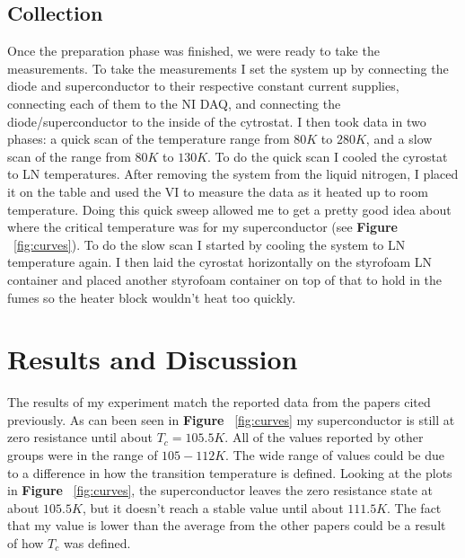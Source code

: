 \documentclass[paper=a4, fontsize=11pt]{scrartcl}
\numberwithin{equation}{section}
\numberwithin{figure}{section}
\numberwithin{table}{section}
\begin{document}
      \subsection{Collection}

            Once the preparation phase was finished, we were ready to take the measurements. To take the measurements I set the system up by connecting the diode and superconductor to their respective constant current supplies, connecting each of them to the NI DAQ, and connecting the diode/superconductor to the inside of the cytrostat. I then took data in two phases: a quick scan of the temperature range from $80K$ to $280K$, and a slow scan of the range from $80K$ to $130 K$. To do the quick scan I cooled the cyrostat to LN temperatures. After removing the system from the liquid nitrogen, I placed it on the table and used the VI to measure the data as it heated up to room temperature. Doing this quick sweep allowed me to get a pretty good idea about where the critical temperature was for my superconductor (see \textbf{Figure} ~\ref{fig:curves}). To do the slow scan I started by cooling the system to LN temperature again. I then laid the cyrostat horizontally on the styrofoam LN container and placed another styrofoam container on top of that to hold in the fumes so the heater block wouldn't heat too quickly.



  \section{Results and Discussion}

      The results of my experiment match the reported data from the papers cited previously. As can been seen in \textbf{Figure} ~\ref{fig:curves} my superconductor is still at zero resistance until about $T_c = 105.5K$.  All of the values reported by other groups were in the range of $105-112K$. The wide range of values could be due to a difference in how the transition temperature is defined. Looking at the plots in \textbf{Figure} ~\ref{fig:curves}, the superconductor leaves the zero resistance state at about $105.5K$, but it doesn't reach a stable value until about $111.5K$. The fact that my value is lower than the average from the other papers could be a result of how $T_c$ was defined.
\end{document}
